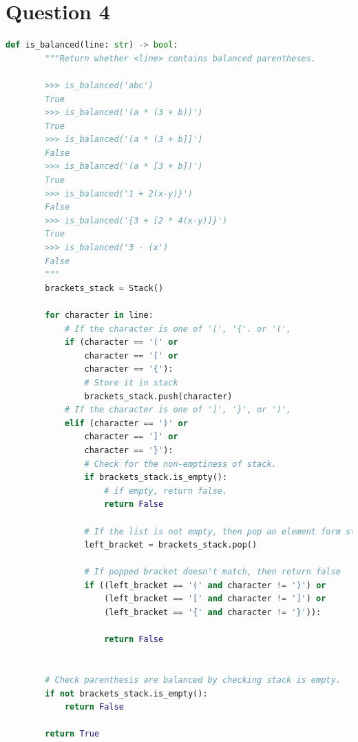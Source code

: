 \documentclass[12pt]{article}
\begin{document}
\section*{Question 4}
\begin{lstlisting}[language=Python,caption={worksheet\_9\_q4\_solution.py},captionpos=b]
    def is_balanced(line: str) -> bool:
        """Return whether <line> contains balanced parentheses.

        >>> is_balanced('abc')
        True
        >>> is_balanced('(a * (3 + b))')
        True
        >>> is_balanced('(a * (3 + b]]')
        False
        >>> is_balanced('(a * [3 + b])')
        True
        >>> is_balanced('1 + 2(x-y)}')
        False
        >>> is_balanced('{3 + [2 * 4(x-y)]}')
        True
        >>> is_balanced('3 - (x')
        False
        """
        brackets_stack = Stack()

        for character in line:
            # If the character is one of '[', '{'. or '(',
            if (character == '(' or
                character == '[' or
                character == '{'):
                # Store it in stack
                brackets_stack.push(character)
            # If the character is one of ']', '}', or ')',
            elif (character == ')' or
                character == ']' or
                character == '}'):
                # Check for the non-emptiness of stack.
                if brackets_stack.is_empty():
                    # if empty, return false.
                    return False

                # If the list is not empty, then pop an element form stack.
                left_bracket = brackets_stack.pop()

                # If popped bracket doesn't match, then return false
                if ((left_bracket == '(' and character != ')') or
                    (left_bracket == '[' and character != ']') or
                    (left_bracket == '{' and character != '}')):

                    return False


        # Check parenthesis are balanced by checking stack is empty.
        if not brackets_stack.is_empty():
            return False

        return True
\end{lstlisting}
\end{document}
